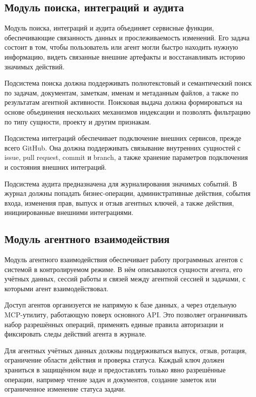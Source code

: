 \textheadingsep
\subsection{Модуль поиска, интеграций и аудита}

\headingtextsep

Модуль поиска, интеграций и аудита объединяет сервисные функции, обеспечивающие связанность данных и прослеживаемость изменений. Его задача состоит в том, чтобы пользователь или агент могли быстро находить нужную информацию, видеть связанные внешние артефакты и восстанавливать историю значимых действий.

Подсистема поиска должна поддерживать полнотекстовый и семантический поиск по задачам, документам, заметкам, именам и метаданным файлов, а также по результатам агентной активности. Поисковая выдача должна формироваться на основе объединения нескольких механизмов индексации и позволять фильтрацию по типу сущности, проекту и другим признакам.

Подсистема интеграций обеспечивает подключение внешних сервисов, прежде всего GitHub. Она должна поддерживать связывание внутренних сущностей с issue, pull request, commit и branch, а также хранение параметров подключения и состояния внешних интеграций.

Подсистема аудита предназначена для журналирования значимых событий. В журнал должны попадать бизнес-операции, административные действия, события входа, изменения прав, выпуск и отзыв агентных ключей, а также действия, инициированные внешними интеграциями.

\textheadingsep
\subsection{Модуль агентного взаимодействия}

\headingtextsep

Модуль агентного взаимодействия обеспечивает работу программных агентов с системой в контролируемом режиме. В нём описываются сущности агента, его учётных данных, сессий работы и связей между агентной сессией и задачами, с которыми агент взаимодействовал.

Доступ агентов организуется не напрямую к базе данных, а через отдельную MCP-утилиту, работающую поверх основного API. Это позволяет ограничивать набор разрешённых операций, применять единые правила авторизации и фиксировать следы действий агента в журнале.

Для агентных учётных данных должны поддерживаться выпуск, отзыв, ротация, ограничение области действия и проверка статуса. Каждый ключ должен храниться в защищённом виде и предоставлять только явно разрешённые операции, например чтение задач и документов, создание заметок или ограниченное изменение статуса задачи.

